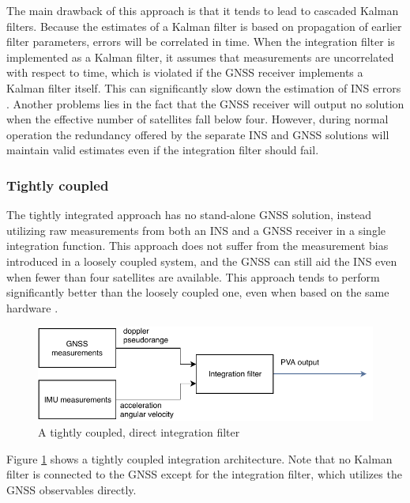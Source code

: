     The main drawback of this approach is that it tends to lead to cascaded Kalman filters. Because the estimates of a Kalman filter is based on propagation of earlier filter parameters, errors will be correlated in time. When the integration filter is implemented as a Kalman filter, it assumes that measurements are uncorrelated with respect to time, which is violated if the GNSS receiver implements a Kalman filter itself. This can significantly slow down the estimation of INS errors \cite{groves2013principles}. Another problems lies in the fact that the GNSS receiver will output no solution when the effective number of satellites fall below four. However, during normal operation the redundancy offered by the separate INS and GNSS solutions will maintain valid estimates even if the integration filter should fail.
    
    \subsubsection{Tightly coupled}
    The tightly integrated approach has no stand-alone GNSS solution, instead utilizing raw measurements from both an INS and a GNSS receiver in a single integration function. This approach does not suffer from the measurement bias introduced in a loosely coupled system, and the GNSS can still aid the INS even when fewer than four satellites are available. This approach tends to perform significantly better than the loosely coupled one, even when based on the same hardware \cite{falco2017loose, tawk2014implementation, groves2013principles}. \\

    \begin{figure}
        \centering
        \includegraphics[scale=0.8]{Theory/bilder/tightly-coupled.pdf}
        \caption{A tightly coupled, direct integration filter}
        \label{fig:tightly_coupled}
    \end{figure}
    Figure \ref{fig:tightly_coupled} shows a tightly coupled integration architecture. Note that no Kalman filter is connected to the GNSS except for the integration filter, which utilizes the GNSS observables directly.\\

